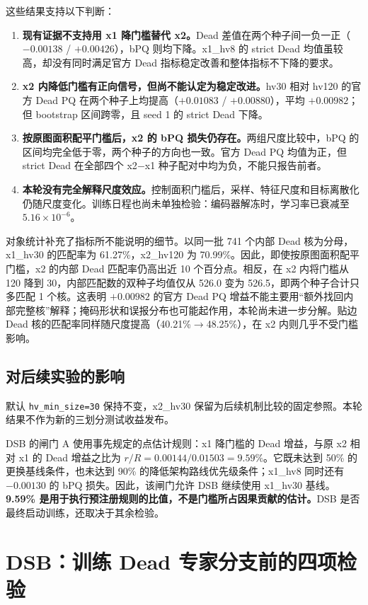 \documentclass[11pt,a4paper,UTF8,fontset=fandol]{ctexart}
\newcommand{\code}[1]{\nolinkurl{#1}}
\begin{document}
这些结果支持以下判断\cite{hvres}：
\begin{enumerate}
\item \textbf{现有证据不支持用 x1 降门槛替代 x2。}Dead 差值在两个种子间一负一正（$-0.00138$ / $+0.00426$），bPQ 则均下降。x1\_hv8 的 strict Dead 均值虽较高，却没有同时满足官方 Dead 指标稳定改善和整体指标不下降的要求。
\item \textbf{x2 内降低门槛有正向信号，但尚不能认定为稳定改进。}hv30 相对 hv120 的官方 Dead PQ 在两个种子上均提高（$+0.01083$ / $+0.00880$），平均 $+0.00982$；但 bootstrap 区间跨零，且 seed 1 的 strict Dead 下降。
\item \textbf{按原图面积配平门槛后，x2 的 bPQ 损失仍存在。}两组尺度比较中，bPQ 的区间均完全低于零，两个种子的方向也一致。官方 Dead PQ 均值为正，但 strict Dead 在全部四个 x2$-$x1 种子配对中均为负，不能只报告前者。
\item \textbf{本轮没有完全解释尺度效应。}控制面积门槛后，采样、特征尺度和目标离散化仍随尺度变化。训练日程也尚未单独检验：编码器解冻时，学习率已衰减至 $5.16\times10^{-6}$。
\end{enumerate}

对象统计补充了指标所不能说明的细节。以同一批 741 个内部 Dead 核为分母，x1\_hv30 的匹配率为 61.27\%，x2\_hv120 为 70.99\%。因此，即使按原图面积配平门槛，x2 的内部 Dead 匹配率仍高出近 10 个百分点。相反，在 x2 内将门槛从 120 降到 30，内部匹配数的双种子均值仅从 526.0 变为 526.5，即两个种子合计只多匹配 1 个核。这表明 $+0.00982$ 的官方 Dead PQ 增益不能主要用“额外找回内部完整核”解释；掩码形状和误报分布也可能起作用，本轮尚未进一步分解。贴边 Dead 核的匹配率同样随尺度提高（40.21\%$\to$48.25\%），在 x2 内则几乎不受门槛影响。

\subsection{对后续实验的影响}

默认 \code{hv\_min\_size=30} 保持不变，x2\_hv30 保留为后续机制比较的固定参照。本轮结果不作为新的三划分测试收益发布。

DSB 的闸门 A 使用事先规定的点估计规则：x1 降门槛的 Dead 增益，与原 x2 相对 x1 的 Dead 增益之比为 $r/R=0.00144/0.01503=9.59\%$。它既未达到 50\% 的更换基线条件，也未达到 90\% 的降低架构路线优先级条件；x1\_hv8 同时还有 $-0.00130$ 的 bPQ 损失。因此，该闸门允许 DSB 继续使用 x1\_hv30 基线。\textbf{9.59\% 是用于执行预注册规则的比值，不是门槛所占因果贡献的估计。}DSB 是否最终启动训练，还取决于其余检验。

\section{DSB：训练 Dead 专家分支前的四项检验}
\end{document}
